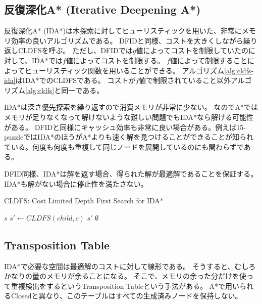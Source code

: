 \subsection{反復深化A* (Iterative Deepening A*)}
\label{sec:iterative-deepening-astar}


反復深化A* (IDA*)は木探索に対してヒューリスティックを用いた、非常にメモリ効率の良いアルゴリズムである\cite{korf:85a}。
DFIDと同様、コストを大きくしながら繰り返しCLDFSを呼ぶ。
ただし、DFIDでは$g$値によってコストを制限していたのに対して、IDA*では$f$値によってコストを制限する。
$f$値によって制限することによってヒューリスティック関数を用いることができる。
アルゴリズム\ref{alg:cldfs-ida}はIDA*でのCLDFSである。
コストが$f$値で制限されていること以外アルゴリズム\ref{alg:cldfs}と同一である。

IDA*は深さ優先探索を繰り返すので消費メモリが非常に少ない。
なのでA*ではメモリが足りなくなって解けないような難しい問題でもIDA*なら解ける可能性がある。
DFIDと同様にキャッシュ効率も非常に良い場合がある。例えば15-puzzleではIDA*のほうがA*よりも速く解を見つけることができることが知られている\cite{korf:85a}。何度も何度も重複して同じノードを展開しているのにも関わらずである。

DFID同様、IDA*は解を返す場合、得られた解が最適解であることを保証する。
IDA*も解がない場合に停止性を満たさない。


\begin{algorithm}
\caption{CLDFS: Cost Limited Depth First Search for IDA*}
\label{alg:cldfs-ida}
	 {
		\Return $s$\;
	}
	 {
		 {
			$s' \leftarrow CLDFS(child, c)$
			 {
				\Return $s'$
			}
		}
	}
	\Return $\emptyset$\;
\end{algorithm}

\subsection{Transposition Table}

IDA*で必要な空間は最適解のコストに対して線形である。
そうすると、むしろかなりの量のメモリが余ることになる。
そこで、メモリの余った分だけを使って重複検出をするというTransposition Tableという手法がある。
A*で用いられるClosedと異なり、このテーブルはすべての生成済みノードを保持しない。


